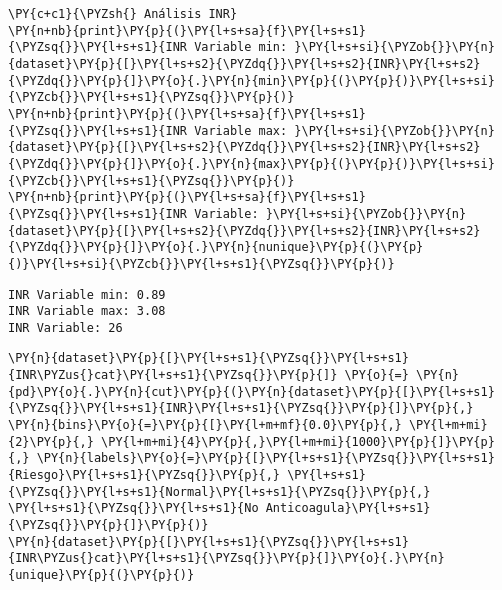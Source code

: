     \begin{tcolorbox}[breakable, size=fbox, boxrule=1pt, pad at break*=1mm,colback=cellbackground, colframe=cellborder]
\begin{Verbatim}[commandchars=\\\{\}]
\PY{c+c1}{\PYZsh{} Análisis INR}
\PY{n+nb}{print}\PY{p}{(}\PY{l+s+sa}{f}\PY{l+s+s1}{\PYZsq{}}\PY{l+s+s1}{INR Variable min: }\PY{l+s+si}{\PYZob{}}\PY{n}{dataset}\PY{p}{[}\PY{l+s+s2}{\PYZdq{}}\PY{l+s+s2}{INR}\PY{l+s+s2}{\PYZdq{}}\PY{p}{]}\PY{o}{.}\PY{n}{min}\PY{p}{(}\PY{p}{)}\PY{l+s+si}{\PYZcb{}}\PY{l+s+s1}{\PYZsq{}}\PY{p}{)}
\PY{n+nb}{print}\PY{p}{(}\PY{l+s+sa}{f}\PY{l+s+s1}{\PYZsq{}}\PY{l+s+s1}{INR Variable max: }\PY{l+s+si}{\PYZob{}}\PY{n}{dataset}\PY{p}{[}\PY{l+s+s2}{\PYZdq{}}\PY{l+s+s2}{INR}\PY{l+s+s2}{\PYZdq{}}\PY{p}{]}\PY{o}{.}\PY{n}{max}\PY{p}{(}\PY{p}{)}\PY{l+s+si}{\PYZcb{}}\PY{l+s+s1}{\PYZsq{}}\PY{p}{)}
\PY{n+nb}{print}\PY{p}{(}\PY{l+s+sa}{f}\PY{l+s+s1}{\PYZsq{}}\PY{l+s+s1}{INR Variable: }\PY{l+s+si}{\PYZob{}}\PY{n}{dataset}\PY{p}{[}\PY{l+s+s2}{\PYZdq{}}\PY{l+s+s2}{INR}\PY{l+s+s2}{\PYZdq{}}\PY{p}{]}\PY{o}{.}\PY{n}{nunique}\PY{p}{(}\PY{p}{)}\PY{l+s+si}{\PYZcb{}}\PY{l+s+s1}{\PYZsq{}}\PY{p}{)}
\end{Verbatim}
\end{tcolorbox}

    \begin{Verbatim}[commandchars=\\\{\}]
INR Variable min: 0.89
INR Variable max: 3.08
INR Variable: 26
    \end{Verbatim}

    \begin{tcolorbox}[breakable, size=fbox, boxrule=1pt, pad at break*=1mm,colback=cellbackground, colframe=cellborder]
\begin{Verbatim}[commandchars=\\\{\}]
\PY{n}{dataset}\PY{p}{[}\PY{l+s+s1}{\PYZsq{}}\PY{l+s+s1}{INR\PYZus{}cat}\PY{l+s+s1}{\PYZsq{}}\PY{p}{]} \PY{o}{=} \PY{n}{pd}\PY{o}{.}\PY{n}{cut}\PY{p}{(}\PY{n}{dataset}\PY{p}{[}\PY{l+s+s1}{\PYZsq{}}\PY{l+s+s1}{INR}\PY{l+s+s1}{\PYZsq{}}\PY{p}{]}\PY{p}{,} \PY{n}{bins}\PY{o}{=}\PY{p}{[}\PY{l+m+mf}{0.0}\PY{p}{,} \PY{l+m+mi}{2}\PY{p}{,} \PY{l+m+mi}{4}\PY{p}{,}\PY{l+m+mi}{1000}\PY{p}{]}\PY{p}{,} \PY{n}{labels}\PY{o}{=}\PY{p}{[}\PY{l+s+s1}{\PYZsq{}}\PY{l+s+s1}{Riesgo}\PY{l+s+s1}{\PYZsq{}}\PY{p}{,} \PY{l+s+s1}{\PYZsq{}}\PY{l+s+s1}{Normal}\PY{l+s+s1}{\PYZsq{}}\PY{p}{,} \PY{l+s+s1}{\PYZsq{}}\PY{l+s+s1}{No Anticoagula}\PY{l+s+s1}{\PYZsq{}}\PY{p}{]}\PY{p}{)}
\PY{n}{dataset}\PY{p}{[}\PY{l+s+s1}{\PYZsq{}}\PY{l+s+s1}{INR\PYZus{}cat}\PY{l+s+s1}{\PYZsq{}}\PY{p}{]}\PY{o}{.}\PY{n}{unique}\PY{p}{(}\PY{p}{)}
\end{Verbatim}
\end{tcolorbox}

